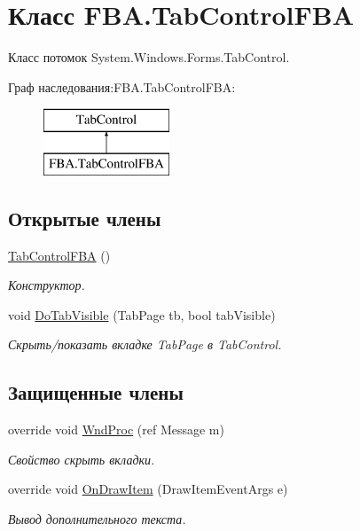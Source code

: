 \hypertarget{class_f_b_a_1_1_tab_control_f_b_a}{}\section{Класс F\+B\+A.\+Tab\+Control\+F\+BA}
\label{class_f_b_a_1_1_tab_control_f_b_a}


Класс потомок System.\+Windows.\+Forms.\+Tab\+Control.  


Граф наследования\+:F\+B\+A.\+Tab\+Control\+F\+BA\+:\begin{figure}[H]
\begin{center}
\leavevmode
\includegraphics[height=2.000000cm]{class_f_b_a_1_1_tab_control_f_b_a}
\end{center}
\end{figure}
\subsection*{Открытые члены}
\begin{DoxyCompactItemize}
\item 
\mbox{\hyperlink{class_f_b_a_1_1_tab_control_f_b_a_a61249027c9ef1b63f0d75af84de49feb}{Tab\+Control\+F\+BA}} ()
\begin{DoxyCompactList}\small\item\em Конструктор. \end{DoxyCompactList}\item 
void \mbox{\hyperlink{class_f_b_a_1_1_tab_control_f_b_a_a581638e5b0ff6e51652315280eb20d0b}{Do\+Tab\+Visible}} (Tab\+Page tb, bool tab\+Visible)
\begin{DoxyCompactList}\small\item\em Скрыть/показать вкладке Tab\+Page в Tab\+Control. \end{DoxyCompactList}\end{DoxyCompactItemize}
\subsection*{Защищенные члены}
\begin{DoxyCompactItemize}
\item 
override void \mbox{\hyperlink{class_f_b_a_1_1_tab_control_f_b_a_a5870ce17005abfe6e88528efceb9ad74}{Wnd\+Proc}} (ref Message m)
\begin{DoxyCompactList}\small\item\em Свойство скрыть вкладки. \end{DoxyCompactList}\item 
override void \mbox{\hyperlink{class_f_b_a_1_1_tab_control_f_b_a_a3e31d80715d16b6849514e4fa887cce8}{On\+Draw\+Item}} (Draw\+Item\+Event\+Args e)
\begin{DoxyCompactList}\small\item\em Вывод дополнительного текста. \end{DoxyCompactList}\end{DoxyCompactItemize}
